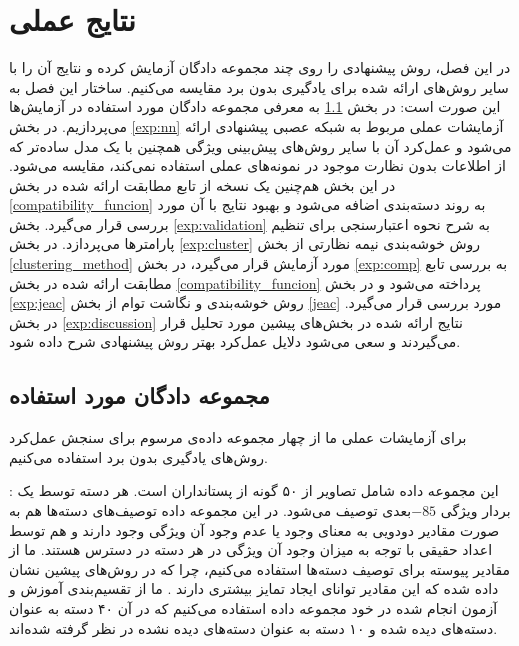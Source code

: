 \chapter{نتایج عملی} \label{chap:experiments}
در این فصل، روش پیشنهادی را روی چند مجموعه دادگان آزمایش کرده و نتایج آن را با سایر روش‌های ارائه شده برای یادگیری بدون برد مقایسه می‌کنیم. ساختار این فصل به این صورت است:
 در بخش \ref{exp:datasets} به معرفی مجموعه دادگان مورد استفاده در آزمایش‌ها می‌پردازیم.
در  بخش \ref{exp:nn} آزمایشات عملی مربوط به شبکه عصبی پیشنهادی ارائه می‌شود و عمل‌کرد آن با سایر روش‌های پیش‌بینی ویژگی همچنین با یک مدل ساده‌تر که از اطلاعات بدون نظارت موجود در نمونه‌های عملی استفاده نمی‌کند، مقایسه می‌شود. در این بخش هم‌چنین یک نسخه از  تابع مطابقت ارائه شده در بخش \ref{compatibility_funcion} به روند دسته‌بندی اضافه می‌شود و بهبود نتایج با آن مورد بررسی قرار می‌گیرد.
بخش \ref{exp:validation} به شرح نحوه اعتبارسنجی برای تنظیم پارامترها می‌پردازد.
 در بخش \ref{exp:cluster} روش خوشه‌بندی نیمه نظارتی از بخش \ref{clustering_method} مورد آزمایش قرار می‌گیرد،
  در بخش \ref{exp:comp} به بررسی تابع مطابقت ارائه شده  در بخش \ref{compatibility_funcion} پرداخته می‌شود
   و در بخش \ref{exp:jeac} روش خوشه‌بندی و نگاشت توام از بخش \ref{jeac} مورد بررسی قرار می‌گیرد.
    در بخش \ref{exp:discussion} نتایج ارائه شده در بخش‌های پیشین مورد تحلیل قرار می‌گیردند و سعی می‌شود دلایل عمل‌کرد بهتر روش پیشنهادی شرح داده شود.


\section{مجموعه دادگان مورد استفاده}\label{exp:datasets}
برای آزمایشات عملی ما از چهار مجموعه داده‌ی مرسوم برای سنجش عمل‌کرد روش‌های یادگیری بدون برد استفاده می‌کنیم.

\textbf{} \cite{lampert09}:
این مجموعه داده شامل تصاویر از ۵۰ گونه از پستانداران است. هر دسته توسط یک بردار ویژگی $-85$بعدی توصیف می‌شود. در این مجموعه داده توصیف‌های دسته‌ها هم به صورت مقادیر دودویی به معنای وجود یا عدم وجود آن ویژگی وجود دارند و هم توسط اعداد حقیقی با توجه به میزان وجود آن ویژگی در هر دسته در دسترس هستند. ما از مقادیر پیوسته برای توصیف دسته‌ها استفاده می‌کنیم، چرا که در روش‌های پیشین نشان داده شده که این مقادیر توانای ایجاد تمایز بیشتری دارند \cite{Akata2015}. ما از تقسیم‌بندی آموزش و آزمون انجام شده در خود مجموعه داده استفاده می‌کنیم که در آن ۴۰ دسته به عنوان دسته‌های دیده شده و ۱۰ دسته به عنوان
دسته‌های دیده نشده در نظر گرفته شده‌اند.

